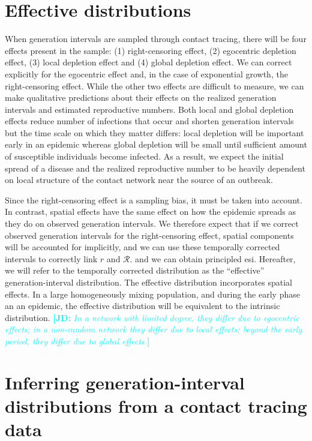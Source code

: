 \documentclass[12pt]{article}
\newcommand{\RR}{\ensuremath{{\mathcal R}}}
\newcommand{\comment}[3]{\textcolor{#1}{\textbf{[#2: }\textsl{#3}\textbf{]}}}
\newcommand{\jd}[1]{\comment{cyan}{JD}{#1}}
\begin{document}
\section{Effective distributions}

When generation intervals are sampled through contact tracing, there will be four effects present in the sample: (1) right-censoring effect, (2) egocentric depletion effect, (3) local depletion effect and (4) global depletion effect.
We can correct explicitly for the egocentric effect and, in the case of exponential growth, the right-censoring effect.
While the other two effects are difficult to measure, we can make qualitative predictions about their effects on the realized generation intervals and estimated reproductive numbers. 
Both local and global depletion effects reduce number of infections that occur and shorten generation intervals but the time scale on which they matter differs:
local depletion will be important early in an epidemic whereas global depletion will be small until sufficient amount of susceptible individuals become infected.
As a result, we expect the initial spread of a disease and the realized reproductive number to be heavily dependent on local structure of the contact network near the source of an outbreak.

Since the right-censoring effect is a sampling bias, it must be taken into account.
In contrast, spatial effects have the same effect on how the epidemic spreads as they do on observed generation intervals. 
We therefore expect that if we correct observed generation intervals for the right-censoring effect, spatial components will be accounted for implicitly, and we can use these temporally corrected intervals to correctly link $r$ and $\RR$. and we can obtain principled esi.
Hereafter, we will refer to the temporally corrected distribution as the ``effective'' generation-interval distribution. The effective distribution incorporates spatial effects. In a large homogeneously mixing population, and during the early phase an an epidemic, the effective distribution will be equivalent to the intrinsic distribution.
\jd{In a network with limited degree, they differ due to egocentric effects; in a non-random network they differ due to local effects; beyond the early period, they differ due to global effects.}

\section{Inferring generation-interval distributions from a contact tracing data}
\end{document}
